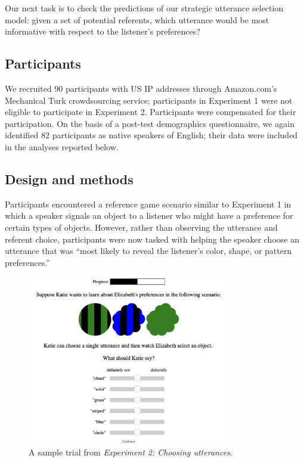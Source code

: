 \documentclass[10pt,a4paper]{article}
\begin{document}
Our next task is to check the predictions of our strategic utterance selection model: given a set of potential referents, which utterance would be most informative with respect to the listener's preferences?

\subsection{Participants}

We recruited 90 participants with US IP addresses through Amazon.com's Mechanical Turk crowdsourcing service; participants in Experiment 1 were not eligible to participate in Experiment 2. Participants were compensated for their participation. On the basis of a post-test demographics questionnaire, we again identified  82 participants as native speakers of English; their data were included in the analyses reported below.

\subsection{Design and methods}

Participants encountered a reference game scenario similar to Experiment 1 in which a speaker signals an object to a listener who might have a preference for certain types of objects. However, rather than observing the utterance and referent choice, participants were now tasked with helping the speaker choose an utterance that was ``most likely to reveal the listener's color, shape, or pattern preferences.''

\begin{figure}[ht]
	\centering
	\includegraphics[width=3.5in]{images/utterance-choice-trial.png}
	\caption{A sample trial from \emph{Experiment 2: Choosing utterances}.}\label{exp2-trial}
\end{figure} 
\end{document}
